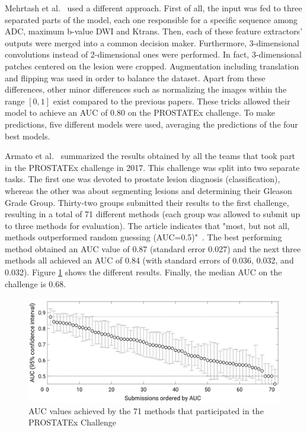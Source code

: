 Mehrtash et al.~\cite{01} used a different approach. First of all, the input was fed to three separated parts of the model, each one responsible for a specific sequence among ADC, maximum b-value DWI and Ktrans. Then, each of these feature extractors' outputs were merged into a common decision maker. Furthermore, 3-dimensional convolutions instead of 2-dimensional ones were performed. In fact, 3-dimensional patches centered on the lesion were cropped. Augmentation including translation and flipping was used in order to balance the dataset. Apart from these differences, other minor differences such as normalizing the images within the range $[0,1]$ exist compared to the previous papers. These tricks allowed their model to achieve an AUC of $0.80$ on the PROSTATEx challenge. To make predictions, five different models were used, averaging the predictions of the four best models.

Armato et al.~\cite{42} summarized the results obtained by all the teams that took part in the PROSTATEx challenge in 2017. This challenge was split into two separate tasks. The first one was devoted to prostate lesion diagnosis (classification), whereas the other was about segmenting lesions and determining their Gleason Grade Group. Thirty-two groups submitted their results to the first challenge, resulting in a total of 71 different methods (each group was allowed to submit up to three methods for evaluation). The article indicates that "most, but not all, methods outperformed random guessing (AUC=0.5)"~\cite{41}. The best performing method obtained an AUC value of 0.87 (standard error 0.027) and the next three methods all achieved an AUC of 0.84 (with standard errors of 0.036, 0.032, and 0.032). Figure \ref{fig:challenge_all_results} shows the different results. Finally, the median AUC on the challenge is $0.68$.
\begin{figure}[!h]
\centering
\includegraphics[width=1\textwidth, keepaspectratio=true]{./figures/challenge_all_results.png}
\caption{AUC values achieved by the 71 methods that participated in the PROSTATEx Challenge~\cite{42}}
\label{fig:challenge_all_results}
\end{figure}


